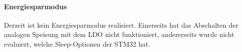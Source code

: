 \paragraph{Energiesparmodus}

Derzeit ist kein Energiesparmodus realisiert. Einerseits hat das Abschalten der analogen Speisung mit dem LDO nicht funktioniert, andererseits wurde nicht evaluiert, welche Sleep-Optionen der STM32 hat.





